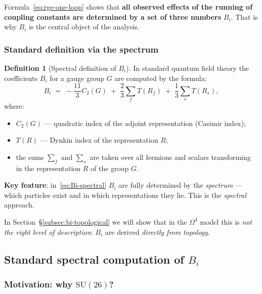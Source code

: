 \documentclass[11pt,a4paper]{article}
\newcommand{\SU}{\ensuremath{\mathrm{SU}}}
\newcommand{\Om}{\ensuremath{\Omega^4}}
\theoremstyle{definition}
\newtheorem{definition}[theorem]{Definition}
\begin{document}
\medskip\noindent
Formula~\eqref{eq:rge-one-loop} shows that \textbf{all
observed effects of the running of coupling constants are determined
by a set of three numbers} $B_i$. That is why $B_i$ is the central object
of the analysis.

\subsubsection{Standard definition via the spectrum}

\begin{definition}[Spectral definition of $B_i$]
\label{def:Bi-spectral}
In standard quantum field theory the coefficients $B_i$ for a
gauge group $G$ are computed by the formula:
\begin{equation}
    \boxed{
    B_i \;=\; -\frac{11}{3} C_2(G)
    \;+\; \frac{2}{3} \sum_{f} T(R_f)
    \;+\; \frac{1}{3} \sum_{s} T(R_s),
    }
    \label{eq:Bi-spectral}
\end{equation}
where:
\begin{itemize}
    \item $C_2(G)$ --- quadratic index of the adjoint
          representation (Casimir index);
    \item $T(R)$ --- Dynkin index of the representation $R$;
    \item the sums $\sum_f$ and $\sum_s$ are taken over all fermions
          and scalars transforming in the representation $R$ of the group $G$.
\end{itemize}
\end{definition}

\medskip\noindent
\textbf{Key feature}: in~\eqref{eq:Bi-spectral} $B_i$ are
fully determined by the \emph{spectrum} --- which particles exist
and in which representations they lie. This is the \emph{spectral}
approach.

In Section~\S\ref{subsec:bi-topological} we will show that in the
$\Om$ model this is \emph{not the right level of description}: $B_i$ are derived
\emph{directly from topology}.

\subsection{Standard spectral computation of \texorpdfstring{$B_i$}{B\_i}}
\label{subsec:bi-standard}

\subsubsection{Motivation: why \texorpdfstring{$\SU(26)$}{(26)}?}
\end{document}

